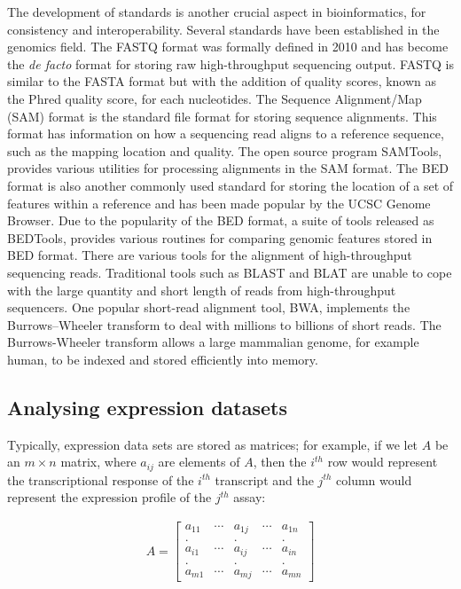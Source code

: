 The development of standards is another crucial aspect in bioinformatics, for consistency and interoperability. Several standards have been established in the genomics field. The FASTQ format was formally defined in 2010\cite{pmid20015970} and has become the \textit{de facto} format for storing raw high-throughput sequencing output. FASTQ is similar to the FASTA format but with the addition of quality scores, known as the Phred quality score, for each nucleotides. The Sequence Alignment/Map (SAM) format\cite{pmid19505943} is the standard file format for storing sequence alignments. This format has information on how a sequencing read aligns to a reference sequence, such as the mapping location and quality. The open source program SAMTools\cite{Li15082009}, provides various utilities for processing alignments in the SAM format. The BED format\cite{bedformat} is also another commonly used standard for storing the location of a set of features within a reference and has been made popular by the UCSC Genome Browser\cite{Kent01062002}. Due to the popularity of the BED format, a suite of tools released as BEDTools\cite{pmid20110278}, provides various routines for comparing genomic features stored in BED format. There are various tools for the alignment of high-throughput sequencing reads. Traditional tools such as BLAST\cite{pmid2231712} and BLAT\cite{pmid11932250} are unable to cope with the large quantity and short length of reads from high-throughput sequencers. One popular short-read alignment tool, BWA\cite{pmid19451168}, implements the Burrows–Wheeler transform to deal with millions to billions of short reads. The Burrows-Wheeler transform allows a large mammalian genome, for example human, to be indexed and stored efficiently into memory\cite{pmid19430453}.

\subsection{Analysing expression datasets}

Typically, expression data sets are stored as matrices; for example, if we let $A$ be an $m \times n$ matrix, where $a_{ij}$ are elements of $A$, then the $i^{th}$ row would represent the transcriptional response of the $i^{th}$ transcript and the $j^{th}$ column would represent the expression profile of the $j^{th}$ assay:

\begin{align*}
   A = \begin{bmatrix} a_{11} & \cdots & a_{1j} & \cdots & a_{1n} \\
   . && . && . \\
   a_{i1} & \cdots & a_{ij} & \cdots & a_{in} \\
   . && . && . \\
   a_{m1} & \cdots & a_{mj} & \cdots & a_{mn} \end{bmatrix}
\end{align*}


